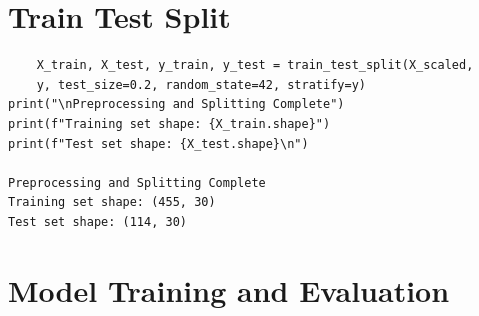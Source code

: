 \documentclass[12pt]{article}
\begin{document}
\section{Train Test Split}
\begin{verbatim}
    X_train, X_test, y_train, y_test = train_test_split(X_scaled, 
    y, test_size=0.2, random_state=42, stratify=y)
print("\nPreprocessing and Splitting Complete")
print(f"Training set shape: {X_train.shape}")
print(f"Test set shape: {X_test.shape}\n")

Preprocessing and Splitting Complete
Training set shape: (455, 30)
Test set shape: (114, 30)
\end{verbatim}
\section{Model Training and Evaluation}
\end{document}
